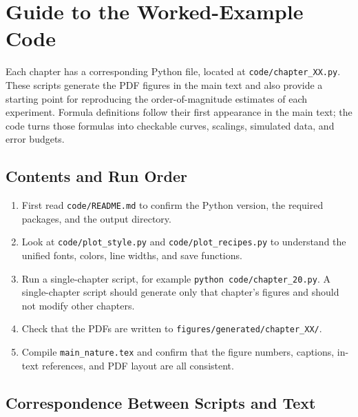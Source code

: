 \chapter{Guide to the Worked-Example Code}
\label{app:e}

Each chapter has a corresponding Python file, located at \texttt{code/chapter\_XX.py}. These scripts generate the PDF figures in the main text and also provide a starting point for reproducing the order-of-magnitude estimates of each experiment. Formula definitions follow their first appearance in the main text; the code turns those formulas into checkable curves, scalings, simulated data, and error budgets.

\section{Contents and Run Order}
\label{appsec:e-run}

\begin{enumerate}[leftmargin=*]
\item First read \texttt{code/README.md} to confirm the Python version, the required packages, and the output directory.
\item Look at \texttt{code/plot\_style.py} and \texttt{code/plot\_recipes.py} to understand the unified fonts, colors, line widths, and save functions.
\item Run a single-chapter script, for example \texttt{python code/chapter\_20.py}. A single-chapter script should generate only that chapter's figures and should not modify other chapters.
\item Check that the PDFs are written to \texttt{figures/generated/chapter\_XX/}.
\item Compile \texttt{main\_nature.tex} and confirm that the figure numbers, captions, in-text references, and PDF layout are all consistent.
\end{enumerate}

\section{Correspondence Between Scripts and Text}
\label{appsec:e-map}

